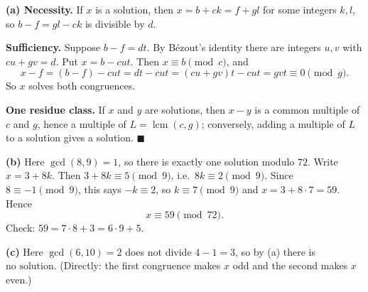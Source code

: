 \textbf{(a) Necessity.} If $x$ is a solution, then $x=b+ck=f+gl$ for some integers $k,l$, so $b-f=gl-ck$ is divisible by $d$.

\textbf{Sufficiency.} Suppose $b-f=dt$. By B\'ezout's identity there are integers $u,v$ with $cu+gv=d$. Put $x=b-cut$. Then $x\equiv b\pmod c$, and
\[
x-f=(b-f)-cut=dt-cut=(cu+gv)t-cut=gvt\equiv0\pmod g .
\]
So $x$ solves both congruences.

\textbf{One residue class.} If $x$ and $y$ are solutions, then $x-y$ is a common multiple of $c$ and $g$, hence a multiple of $L=\operatorname{lcm}(c,g)$; conversely, adding a multiple of $L$ to a solution gives a solution. $\blacksquare$

\textbf{(b)} Here $\gcd(8,9)=1$, so there is exactly one solution modulo $72$. Write $x=3+8k$. Then $3+8k\equiv5\pmod9$, i.e.\ $8k\equiv2\pmod9$. Since $8\equiv-1\pmod9$, this says $-k\equiv2$, so $k\equiv7\pmod9$ and $x=3+8\cdot7=59$. Hence
\[
x\equiv\boxed{59\pmod{72}}.
\]
Check: $59=7\cdot8+3=6\cdot9+5$.

\textbf{(c)} Here $\gcd(6,10)=2$ does not divide $4-1=3$, so by (a) there is $\boxed{\text{no solution}}$. (Directly: the first congruence makes $x$ odd and the second makes $x$ even.)
